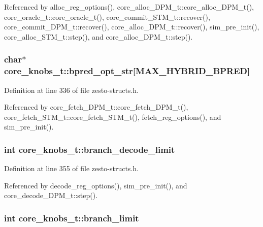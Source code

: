 Referenced by alloc\_\-reg\_\-options(), core\_\-alloc\_\-DPM\_\-t::core\_\-alloc\_\-DPM\_\-t(), core\_\-oracle\_\-t::core\_\-oracle\_\-t(), core\_\-commit\_\-STM\_\-t::recover(), core\_\-commit\_\-DPM\_\-t::recover(), core\_\-alloc\_\-DPM\_\-t::recover(), sim\_\-pre\_\-init(), core\_\-alloc\_\-STM\_\-t::step(), and core\_\-alloc\_\-DPM\_\-t::step().
\subsubsection[{bpred\_\-opt\_\-str}]{\setlength{\rightskip}{0pt plus 5cm}char$\ast$ {\bf core\_\-knobs\_\-t::bpred\_\-opt\_\-str}[MAX\_\-HYBRID\_\-BPRED]}\label{structcore__knobs__t_7b83939598abed42aee2ef81dbeda645}




Definition at line 336 of file zesto-structs.h.

Referenced by core\_\-fetch\_\-DPM\_\-t::core\_\-fetch\_\-DPM\_\-t(), core\_\-fetch\_\-STM\_\-t::core\_\-fetch\_\-STM\_\-t(), fetch\_\-reg\_\-options(), and sim\_\-pre\_\-init().
\subsubsection[{branch\_\-decode\_\-limit}]{\setlength{\rightskip}{0pt plus 5cm}int {\bf core\_\-knobs\_\-t::branch\_\-decode\_\-limit}}\label{structcore__knobs__t_9b6f98794199b9cd277b63a53f57a951}




Definition at line 355 of file zesto-structs.h.

Referenced by decode\_\-reg\_\-options(), sim\_\-pre\_\-init(), and core\_\-decode\_\-DPM\_\-t::step().
\subsubsection[{branch\_\-limit}]{\setlength{\rightskip}{0pt plus 5cm}int {\bf core\_\-knobs\_\-t::branch\_\-limit}}\label{structcore__knobs__t_0b19d96dc6890d63fa3bfc5d11221302}




